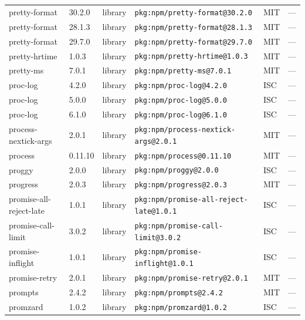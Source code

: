 \documentclass[11pt,a4paper]{article}
\begin{document}
\begin{longtable}{|p{4cm}|p{2cm}|p{1.6cm}|p{5cm}|p{1.5cm}|p{3.5cm}|}
\raggedright pretty-format & 30.2.0 & library & \small\texttt{pkg:npm/pretty-format@30.2.0} & MIT & \small — \\
\raggedright pretty-format & 28.1.3 & library & \small\texttt{pkg:npm/pretty-format@28.1.3} & MIT & \small — \\
\raggedright pretty-format & 29.7.0 & library & \small\texttt{pkg:npm/pretty-format@29.7.0} & MIT & \small — \\
\raggedright pretty-hrtime & 1.0.3 & library & \small\texttt{pkg:npm/pretty-hrtime@1.0.3} & MIT & \small — \\
\raggedright pretty-ms & 7.0.1 & library & \small\texttt{pkg:npm/pretty-ms@7.0.1} & MIT & \small — \\
\raggedright proc-log & 4.2.0 & library & \small\texttt{pkg:npm/proc-log@4.2.0} & ISC & \small — \\
\raggedright proc-log & 5.0.0 & library & \small\texttt{pkg:npm/proc-log@5.0.0} & ISC & \small — \\
\raggedright proc-log & 6.1.0 & library & \small\texttt{pkg:npm/proc-log@6.1.0} & ISC & \small — \\
\raggedright process-nextick-args & 2.0.1 & library & \small\texttt{pkg:npm/process-nextick-args@2.0.1} & MIT & \small — \\
\raggedright process & 0.11.10 & library & \small\texttt{pkg:npm/process@0.11.10} & MIT & \small — \\
\raggedright proggy & 2.0.0 & library & \small\texttt{pkg:npm/proggy@2.0.0} & ISC & \small — \\
\raggedright progress & 2.0.3 & library & \small\texttt{pkg:npm/progress@2.0.3} & MIT & \small — \\
\raggedright promise-all-reject-late & 1.0.1 & library & \small\texttt{pkg:npm/promise-all-reject-late@1.0.1} & ISC & \small — \\
\raggedright promise-call-limit & 3.0.2 & library & \small\texttt{pkg:npm/promise-call-limit@3.0.2} & ISC & \small — \\
\raggedright promise-inflight & 1.0.1 & library & \small\texttt{pkg:npm/promise-inflight@1.0.1} & ISC & \small — \\
\raggedright promise-retry & 2.0.1 & library & \small\texttt{pkg:npm/promise-retry@2.0.1} & MIT & \small — \\
\raggedright prompts & 2.4.2 & library & \small\texttt{pkg:npm/prompts@2.4.2} & MIT & \small — \\
\raggedright promzard & 1.0.2 & library & \small\texttt{pkg:npm/promzard@1.0.2} & ISC & \small — \\

\end{longtable}
\end{document}
